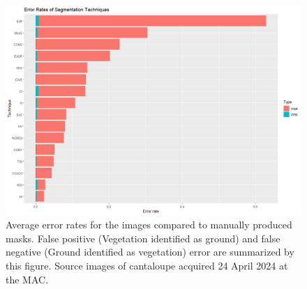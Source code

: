 \documentclass[letterpaper, notitlepage]{report}
\begin{document}
{%
\begin{figure}[h]
	\centering
	\includegraphics[width=.90\linewidth]{figures/segmentation-error-rates.png}
	\caption[Error rates of segmentation algorithms]{Average error rates for the images compared to manually produced masks. False positive (Vegetation identified as ground) and false negative (Ground identified as vegetation) error are summarized by this figure. Source images of cantaloupe acquired 24 April 2024 at the MAC. }
	\label{fig:segmentation-errors}
\end{figure}

}
\end{document}
